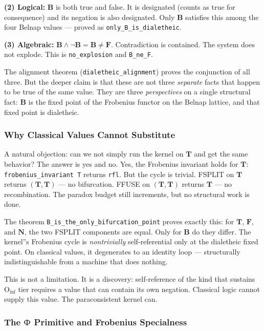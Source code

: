 \documentclass[12pt,a4paper]{article}
\begin{document}
\textbf{(2) Logical:} $\mathbf{B}$ is both true and false. It is designated (counts as true for consequence) and its negation is also designated. Only $\mathbf{B}$ satisfies this among the four Belnap values --- proved as \texttt{only\_B\_is\_dialetheic}.

\textbf{(3) Algebraic:} $\mathbf{B} \land \neg \mathbf{B} = \mathbf{B} \neq \mathbf{F}$. Contradiction is contained. The system does not explode. This is \texttt{no\_explosion} and \texttt{B\_ne\_F}.

The alignment theorem (\texttt{dialetheic\_alignment}) proves the conjunction of all three. But the deeper claim is that these are not three \emph{separate} facts that happen to be true of the same value. They are three \emph{perspectives} on a single structural fact: $\mathbf{B}$ is the fixed point of the Frobenius functor on the Belnap lattice, and that fixed point is dialetheic.

\subsubsection{Why Classical Values Cannot Substitute}

A natural objection: can we not simply run the kernel on $\mathbf{T}$ and get the same behavior? The answer is yes and no. Yes, the Frobenius invariant holds for $\mathbf{T}$: \texttt{frobenius\_invariant T} returns \texttt{rfl}. But the cycle is trivial. FSPLIT on $\mathbf{T}$ returns $(\mathbf{T}, \mathbf{T})$ --- no bifurcation. FFUSE on $(\mathbf{T}, \mathbf{T})$ returns $\mathbf{T}$ --- no recombination. The paradox budget still increments, but no structural work is done.

The theorem \texttt{B\_is\_the\_only\_bifurcation\_point} proves exactly this: for $\mathbf{T}$, $\mathbf{F}$, and $\mathbf{N}$, the two FSPLIT components are equal. Only for $\mathbf{B}$ do they differ. The kernel''s Frobenius cycle is \emph{nontrivially} self-referential only at the dialetheic fixed point. On classical values, it degenerates to an identity loop --- structurally indistinguishable from a machine that does nothing.

This is not a limitation. It is a discovery: self-reference of the kind that sustains $\text{O}_{\text{inf}}$ tier requires a value that can contain its own negation. Classical logic cannot supply this value. The paraconsistent kernel can.

\subsubsection{The $\text{Ф}_{\text{}}$ Primitive and Frobenius Specialness}
\end{document}

